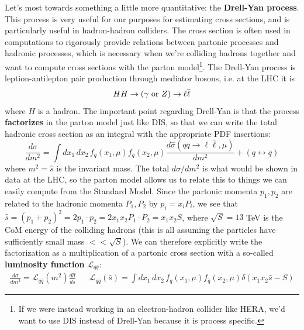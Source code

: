 \documentclass[11pt, oneside]{article}   	%
\theoremstyle{definition}
\numberwithin{equation}{subsection}		%
\begin{document}
Let's most towards something a little more quantitative: the \textbf{Drell-Yan process}. This process is very useful for our purposes for 
estimating cross sections, and is particularly useful in hadron-hadron colliders. The cross section is often used in computations to rigorously 
provide relations between partonic processes and hadronic processes, which is necessary when we're colliding hadrons together and want to 
compute cross sections with the parton model\footnote{If we were instead working in an electron-hadron collider like HERA, we'd want to use 
DIS instead of Drell-Yan because it is process specific.}. The Drell-Yan process is leption-antilepton pair production through mediator bosons, 
i.e. at the LHC it is 
\begin{equation}
	HH\rightarrow (\gamma\textnormal{ or } Z) \rightarrow \ell\overline\ell
\end{equation}
where $H$ is a hadron. The important point regarding Drell-Yan is that the process \textbf{factorizes} in the parton model just like DIS, so that we can write the total 
hadronic cross section as an integral with the appropriate PDF insertions:
\begin{equation}
	\frac{d\sigma}{d m^2} = \int dx_1\,dx_2\, f_q(x_1, \mu) f_{\overline q}(x_2, \mu) \frac{d\hat\sigma(q\overline q\rightarrow \ell\overline\ell, \mu)}{dm^2} + (q\leftrightarrow\overline q)
\end{equation}
where $m^2 = \hat s$ is the invariant mass. The total $d\sigma / dm^2$ is what would be shown in data at the LHC, so the parton model 
allows us to relate this to things we can easily compute from the Standard Model. Since the partonic momenta $p_1, p_2$ are related to the 
hadronic momenta $P_1, P_2$ by $p_i = x_i P_i$, we see that $\hat s = (p_1 + p_2)^2 = 2 p_1\cdot p_2 = 2 x_1 x_2 P_1\cdot P_2 = x_1 x_2 
S$, where $\sqrt S = 13$ TeV is the CoM energy of the colliding hadrons (this is all assuming the particles have sufficiently small mass $<< \sqrt S$). 
We can therefore explicitly write the factorization as a multiplication of a partonic cross section with a so-called \textbf{luminosity function} 
$\mathcal L_{q\overline q}$:
\begin{align}
	\frac{d\sigma}{dm^2} = \mathcal L_{q\overline q}(m^2) \frac{d\hat\sigma}{d\hat s} && \mathcal L_{q\overline q}(\hat s) = \int dx_1\,dx_2\, f_q(x_1, \mu) f_{\overline q}(x_2, \mu) 
	\delta(x_1 x_2\hat s - S)
\end{align}
\end{document}

